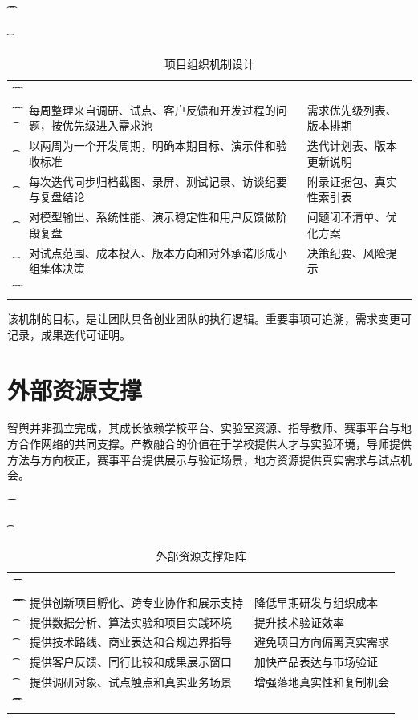 \begin{table}[htbp]
	\t\centering
	\t\caption{项目组织机制设计}
	\t\begin{tabularx}{\textwidth}{|L{3cm}YL{3cm}|}
		\t\t\toprule
		\t\t{} &                      &  \\
		\t\t\midrule
		\t\t{}
		\t{}         & 每周整理来自调研、试点、客户反馈和开发过程的问题，按优先级进入需求池 & 需求优先级列表、版本排期   \\
		\t{}         & 以两周为一个开发周期，明确本期目标、演示件和验收标准         & 迭代计划表、版本更新说明   \\
		\t{}         & 每次迭代同步归档截图、录屏、测试记录、访谈纪要与复盘结论       & 附录证据包、真实性索引表   \\
		\t{}         & 对模型输出、系统性能、演示稳定性和用户反馈做阶段复盘         & 问题闭环清单、优化方案    \\
		\t{}       & 对试点范围、成本投入、版本方向和对外承诺形成小组集体决策       & 决策纪要、风险提示      \\
		\t\t\bottomrule
		\t\end{tabularx}
\end{table}

该机制的目标，是让团队具备创业团队的执行逻辑。重要事项可追溯，需求变更可记录，成果迭代可证明。

\section{外部资源支撑}

智舆并非孤立完成，其成长依赖学校平台、实验室资源、指导教师、赛事平台与地方合作网络的共同支撑。产教融合的价值在于学校提供人才与实验环境，导师提供方法与方向校正，赛事平台提供展示与验证场景，地方资源提供真实需求与试点机会。

\begin{table}[htbp]
	\t\centering
	\t\caption{外部资源支撑矩阵}
	\t\begin{tabularx}{\textwidth}{|L{3cm}YL{3cm}|}
		\t\t\toprule
		\t\t{} &       &  \\
		\t\t\midrule
		\t\t{}
		\t{}           & 提供创新项目孵化、跨专业协作和展示支持 & 降低早期研发与组织成本    \\
		\t{}       & 提供数据分析、算法实验和项目实践环境  & 提升技术验证效率       \\
		\t{}           & 提供技术路线、商业表达和合规边界指导  & 避免项目方向偏离真实需求   \\
		\t{}           & 提供客户反馈、同行比较和成果展示窗口  & 加快产品表达与市场验证    \\
		\t{}         & 提供调研对象、试点触点和真实业务场景  & 增强落地真实性和复制机会   \\
		\t\t\bottomrule
		\t\end{tabularx}
\end{table}

